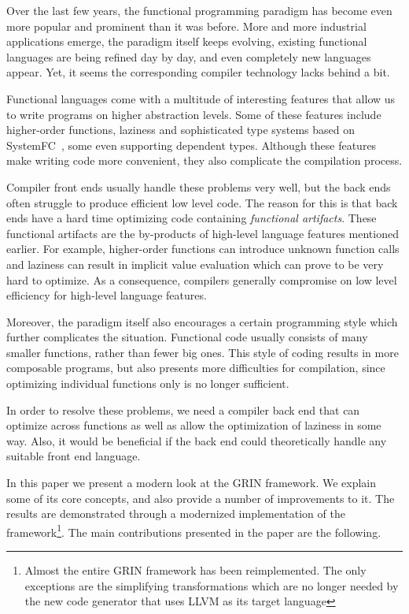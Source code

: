 \documentclass[main.tex]{subfiles}
\begin{document}
	
	Over the last few years, the functional programming paradigm has become even more popular and prominent than it was before. More and more industrial applications emerge, the paradigm itself keeps evolving, existing functional languages are being refined day by day, and even completely new languages appear. Yet, it seems the corresponding compiler technology lacks behind a bit.
	
	Functional languages come with a multitude of interesting features that allow us to write programs on higher abstraction levels. Some of these features include higher-order functions, laziness and sophisticated type systems based on SystemFC~\cite{systemfc}, some even supporting dependent types. Although these features make writing code more convenient, they also complicate the compilation process.
	
	Compiler front ends usually handle these problems very well, but the back ends often struggle to produce efficient low level code. The reason for this is that back ends have a hard time optimizing code containing \emph{functional artifacts}. These functional artifacts are the by-products of high-level language features mentioned earlier. For example, higher-order functions can introduce unknown function calls and laziness can result in implicit value evaluation which can prove to be very hard to optimize. As a consequence, compilers generally compromise on low level efficiency for high-level language features.
	
	Moreover, the paradigm itself also encourages a certain programming style which further complicates the situation. Functional code usually consists of many smaller functions, rather than fewer big ones. This style of coding results in more composable programs, but also presents more difficulties for compilation, since optimizing individual functions only is no longer sufficient. 
	
	In order to resolve these problems, we need a compiler back end that can optimize across functions as well as allow the optimization of laziness in some way. Also, it would be beneficial if the back end could theoretically handle any suitable front end language.
	
	In this paper we present a modern look at the GRIN framework. We explain some of its core concepts, and also provide a number of improvements to it. The results are demonstrated through a modernized implementation of the framework\footnote{Almost the entire GRIN framework has been reimplemented. The only exceptions are the simplifying transformations which are no longer needed by the new code generator that uses LLVM as its target language}. The main contributions presented in the paper are the following.
	
\end{document}
